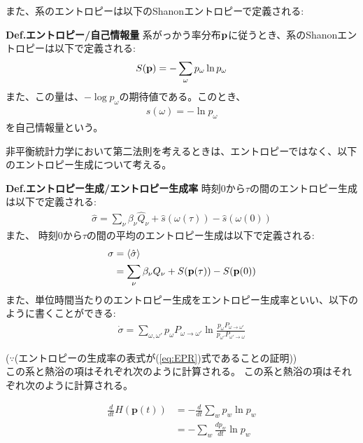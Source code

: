 \documentclass[a4paper,11pt]{jsarticle}
\numberwithin{equation}{section}
\begin{document}
また、系のエントロピーは以下のShanonエントロピーで定義される:

\begin{itembox}[l]{\textbf{Def.エントロピー/自己情報量}}
  系がっかう率分布$\vb{p}$に従うとき、系のShanonエントロピーは以下で定義される:
  \begin{align}
    S(\vb{p}) = -\sum_{\omega}p_{\omega}\ln p_{\omega}
  \end{align}
  また、この量は、$-\log p_{\omega}$の期待値である。このとき、
  \begin{align}
    s(\omega) = -\ln p_{\omega}
  \end{align}
  を自己情報量という。
\end{itembox}


非平衡統計力学において第二法則を考えるときは、エントロピーではなく、以下のエントロピー生成について考える。\\
\begin{itembox}[l]{\textbf{Def.エントロピー生成/エントロピー生成率}}
  時刻$0$から$\tau$の間のエントロピー生成は以下で定義される:
  \begin{align}
    \hat{\sigma} = \sum_{\nu} \beta_{\nu}\hat{Q}_{\nu} + \hat{s}(\omega(\tau)) - \hat{s}(\omega(0))
  \end{align}
  また、  時刻$0$から$\tau$の間の平均のエントロピー生成は以下で定義される:
  \begin{align}
    \sigma &= \expval{\hat{\sigma}}\\
    &= \sum_{\nu} \beta_{\nu} Q_{\nu} + S(\vb{p}(\tau)) - S(\vb{p}(0))
  \end{align}
  また、単位時間当たりのエントロピー生成をエントロピー生成率といい、以下のように書くことができる:
  \begin{align}
    \dot{\sigma} = \sum_{\omega,\omega'}p_{\omega}P_{\omega \to \omega'}\ln \frac{p_{\omega}P_{\omega \to \omega'}}{p_{\omega'}P_{\omega' \to \omega}} \label{eq:EPR}
  \end{align}
\end{itembox}
($\because$(エントロピーの生成率の表式が(\ref{eq:EPR})式であることの証明))\\
この系と熱浴の項はそれぞれ次のように計算される。
この系と熱浴の項はそれぞれ次のように計算される。

\begin{align}
\frac{d}{dt} H(\mathbf{p}(t)) &= - \frac{d}{dt} \sum_w p_w \ln p_w \\
&= - \sum_w \frac{dp_w}{dt} \ln p_w
\end{align}
\end{document}

